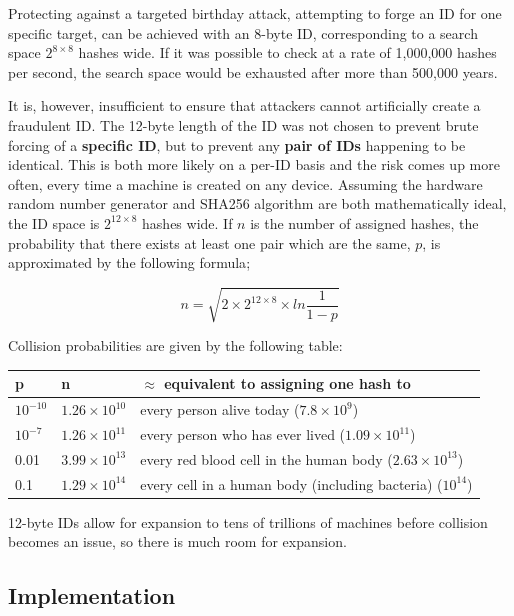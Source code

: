 \documentclass{article}
\begin{document}
Protecting against a targeted birthday attack, attempting to forge an ID for one specific target, can be achieved with an 8-byte ID, corresponding to a search space \( 2^{8 \times 8} \) hashes wide. If it was possible to check at a rate of 1,000,000 hashes per second, the search space would be exhausted after more than 500,000 years.

It is, however, insufficient to ensure that attackers cannot artificially create a fraudulent ID. The 12-byte length of the ID was not chosen to prevent brute forcing of a \textbf{specific ID}, but to prevent any \textbf{pair of IDs} happening to be identical. This is both more likely on a per-ID basis and the risk comes up more often, every time a machine is created on any device. Assuming the hardware random number generator and SHA256 algorithm are both mathematically ideal, the ID space is \( 2^{12 \times 8} \) hashes wide. If \( n \) is the number of assigned hashes, the probability that there exists at least one pair which are the same, \( p \), is approximated by the following formula\cite{birth};

\[ n = \sqrt{2 \times 2^{12 \times 8} \times ln\frac{1}{1-p}}\]

Collision probabilities are given by the following table:
\begin{table}[H]
\begin{tabular}{l|l|l}
p				&n							&\( \approx \) equivalent to assigning one hash to \\ \hline
\( 10^{-10}\)	&\( 1.26 \times 10^{10}\)	& every person alive today (\( 7.8 \times 10^{9}\))\\
\( 10^{-7}\)	&\( 1.26 \times 10^{11}\)	& every person who has ever lived (\( 1.09 \times 10^{11}\)) \\
0.01			&\( 3.99 \times 10^{13}\)	& every red blood cell in the human body (\( 2.63 \times 10^{13}\)) \\
0.1				&\( 1.29 \times 10^{14}\)	& every cell in a human body (including bacteria) (\( 10^{14}\))

\end{tabular}
\end{table}

12-byte IDs allow for expansion to tens of trillions of machines before collision becomes an issue, so there is much room for expansion.

\subsection{Implementation}
\end{document}
